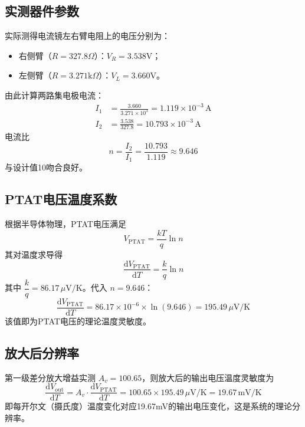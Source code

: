 \documentclass[12pt,a4paper]{article}
\begin{document}
\subsection{实测器件参数}
实际测得电流镜左右臂电阻上的电压分别为：
\begin{itemize}
    \item 右侧臂（$R=327.8\Omega$）：$V_R = 3.538\mathrm{V}$；
    \item 左侧臂（$R=3.271\mathrm{k}\Omega$）：$V_L = 3.660\mathrm{V}$。
\end{itemize}
由此计算两路集电极电流：
\begin{align}
    I_1 &= \frac{3.660}{3.271\times 10^3} = 1.119\times 10^{-3}\,\mathrm{A} \\
    I_2 &= \frac{3.538}{327.8} = 10.793\times 10^{-3}\,\mathrm{A}
\end{align}
电流比
\begin{equation}
    n = \frac{I_2}{I_1} = \frac{10.793}{1.119} \approx 9.646
\end{equation}
与设计值10吻合良好。

\subsection{PTAT电压温度系数}
根据半导体物理，PTAT电压满足
\begin{equation}
    V_{\mathrm{PTAT}} = \frac{kT}{q} \ln n
\end{equation}
其对温度求导得
\begin{equation}
    \frac{\mathrm{d}V_{\mathrm{PTAT}}}{\mathrm{d}T} = \frac{k}{q}\ln n
\end{equation}
其中 $\dfrac{k}{q} = 86.17\,\mu\mathrm{V/K}$。代入 $n=9.646$：
\begin{equation}
    \frac{\mathrm{d}V_{\mathrm{PTAT}}}{\mathrm{d}T} = 86.17\times 10^{-6} \times \ln(9.646) = 195.49\,\mu\mathrm{V/K}
\end{equation}
该值即为PTAT电压的理论温度灵敏度。

\subsection{放大后分辨率}
第一级差分放大增益实测 $A_v = 100.65$，则放大后的输出电压温度灵敏度为
\begin{equation}
    \frac{\mathrm{d}V_{\mathrm{out}}}{\mathrm{d}T} = A_v \cdot \frac{\mathrm{d}V_{\mathrm{PTAT}}}{\mathrm{d}T}
    = 100.65 \times 195.49\,\mu\mathrm{V/K} = 19.67\,\mathrm{mV/K}
\end{equation}
即每开尔文（摄氏度）温度变化对应19.67mV的输出电压变化，这是系统的理论分辨率。
\end{document}
